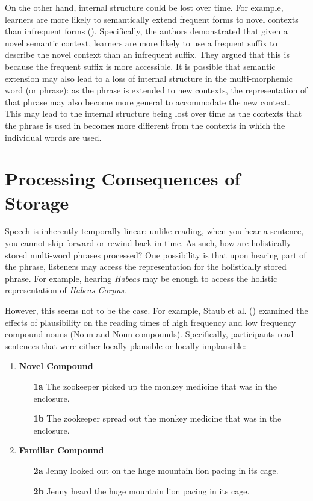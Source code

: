 \documentclass[
  12pt,
  letterpaper,
]{scrreprt}
\begin{document}
On the other hand, internal structure could be lost over time. For
example, learners are more likely to semantically extend frequent forms
to novel contexts than infrequent forms
().
Specifically, the authors demonstrated that given a novel semantic
context, learners are more likely to use a frequent suffix to describe
the novel context than an infrequent suffix. They argued that this is
because the frequent suffix is more accessible. It is possible that
semantic extension may also lead to a loss of internal structure in the
multi-morphemic word (or phrase): as the phrase is extended to new
contexts, the representation of that phrase may also become more general
to accommodate the new context. This may lead to the internal structure
being lost over time as the contexts that the phrase is used in becomes
more different from the contexts in which the individual words are used.

\section{Processing Consequences of
Storage}\label{sec-processing-consequences-of-storage}

Speech is inherently temporally linear: unlike reading, when you hear a
sentence, you cannot skip forward or rewind back in time. As such, how
are holistically stored multi-word phrases processed? One possibility is
that upon hearing part of the phrase, listeners may access the
representation for the holistically stored phrase. For example, hearing
\emph{Habeas} may be enough to access the holistic representation of
\emph{Habeas Corpus}.

However, this seems not to be the case. For example, Staub et al.
() examined the
effects of plausibility on the reading times of high frequency and low
frequency compound nouns (Noun and Noun compounds). Specifically,
participants read sentences that were either locally plausible or
locally implausible:

\begin{enumerate} 

    \item \textbf{Novel Compound}
    \begin{enumerate}
        \item[\textbf{1a}] The zookeeper picked up the monkey medicine that was in the enclosure.
        \item[\textbf{1b}] The zookeeper spread out the monkey medicine that was in the enclosure.
    \end{enumerate} \label{staubsentencenovel}
    \item \textbf{Familiar Compound}
    \begin{enumerate}
        \item[\textbf{2a}] Jenny looked out on the huge mountain lion pacing in its cage. \label{familiarplaus}
        \item[\textbf{2b}] Jenny heard the huge mountain lion pacing in its cage. \label{familiarimplaus}
    \end{enumerate} \label{staubsentencefamiliar}
\end{enumerate}
\end{document}
